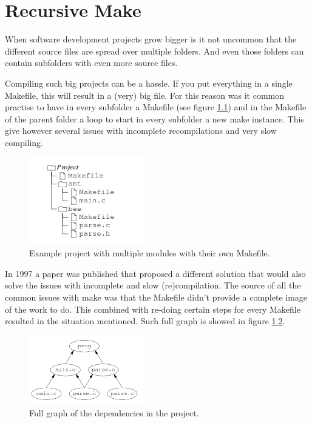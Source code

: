 \chapter{Recursive Make}
\label{chap:rMake}

When software development projects grow bigger is it not uncommon that the different source files are spread over multiple folders. And even those folders can contain subfolders with even more source files.

Compiling such big projects can be a hassle. If you put everything in a single Makefile, this will result in a (very) big file. For this reason was it common practise to have in every subfolder a Makefile (see figure \ref{fig:recmake_project}) and in the Makefile of the parent folder a loop to start in every subfolder a new make instance. This give however several issues with incomplete recompilations and very slow compiling.

 \begin{figure}[H]
  \centering
  \includegraphics[width=5cm]{Images/recmake-project.png}
  \caption{ Example project with multiple modules with their own Makefile.}
  \label{fig:recmake_project}
\end{figure}

In 1997 a paper \cite{recmake} was published that proposed a different solution that would also solve the issues with incomplete and slow (re)compilation. The source of all the common issues with make was that the Makefile didn't provide a complete image of the work to do. This combined with re-doing certain steps for every Makefile resulted in the situation mentioned. Such full graph is showed in figure \ref{fig:recmake_fullgraph}.

\begin{figure}[H]
  \centering
  \includegraphics[width=5cm]{Images/makerec-fulll-graph.png}
  \caption{ Full graph of the dependencies in the project. }
  \label{fig:recmake_fullgraph}
\end{figure}

